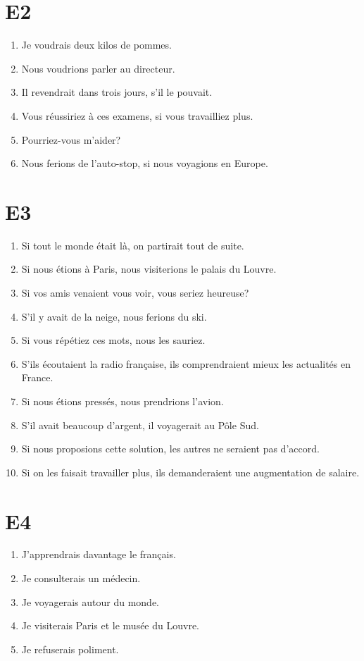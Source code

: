 \documentclass{book}
\begin{document}
    \section{E2}
        \begin{enumerate}
            \item Je voudrais deux kilos de pommes.
            \item Nous voudrions parler au directeur.
            \item Il revendrait dans trois jours, s'il le pouvait.
            \item Vous réussiriez à ces examens, si vous travailliez plus.
            \item Pourriez-vous m'aider?
            \item Nous ferions de l'auto-stop, si nous voyagions en Europe.
        \end{enumerate}

    \section{E3}
        \begin{enumerate}
            \item Si tout le monde était là, on partirait tout de suite.
            \item Si nous étions à Paris, nous visiterions le palais du Louvre.
            \item Si vos amis venaient vous voir, vous seriez heureuse?
            \item S'il y avait de la neige, nous ferions du ski.
            \item Si vous répétiez ces mots, nous les sauriez.
            \item S'ils écoutaient la radio française, ils comprendraient mieux les actualités en France.
            \item Si nous étions pressés, nous prendrions l'avion.
            \item S'il avait beaucoup d'argent, il voyagerait au Pôle Sud.
            \item Si nous proposions cette solution, les autres ne seraient pas d'accord.
            \item Si on les faisait travailler plus, ils demanderaient une augmentation de salaire.
        \end{enumerate}

    \section{E4}
        \begin{enumerate}
            \item J'apprendrais davantage le français.
            \item Je consulterais un médecin.
            \item Je voyagerais autour du monde.
            \item Je visiterais Paris et le musée du Louvre.
            \item Je refuserais poliment.
        \end{enumerate}
    
\end{document}
